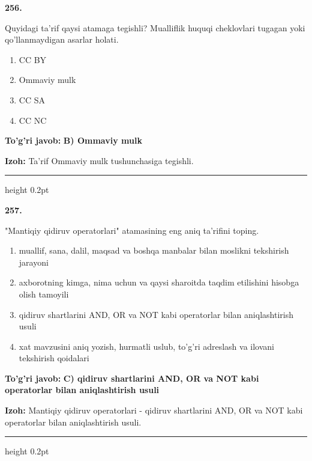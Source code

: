 \documentclass[10pt,a4paper,oneside]{article}
\begin{document}
\noindent\textbf{\color{ink}256.}
\par
Quyidagi ta'rif qaysi atamaga tegishli? Mualliflik huquqi cheklovlari tugagan yoki qo'llanmaydigan asarlar holati.
\begin{enumerate}[label=\Alph*),leftmargin=9mm]
\item CC BY
\item Ommaviy mulk
\item CC SA
\item CC NC
\end{enumerate}
\begin{tcolorbox}[enhanced,breakable,colback=teal!4,colframe=teal!50!black,boxrule=0.5pt,arc=1.1mm,left=3mm,right=3mm,top=1.7mm,bottom=1.7mm,before skip=2mm,after skip=2mm]
\textbf{\color{teal}To'g'ri javob:} \textbf{B) Ommaviy mulk}
\par\smallskip
\textbf{Izoh:} Ta'rif Ommaviy mulk tushunchasiga tegishli.
\end{tcolorbox}
\vspace{2mm}\hrule height 0.2pt \vspace{3mm}

\noindent\textbf{\color{ink}257.}
\par
"Mantiqiy qidiruv operatorlari" atamasining eng aniq ta'rifini toping.
\begin{enumerate}[label=\Alph*),leftmargin=9mm]
\item muallif, sana, dalil, maqsad va boshqa manbalar bilan moslikni tekshirish jarayoni
\item axborotning kimga, nima uchun va qaysi sharoitda taqdim etilishini hisobga olish tamoyili
\item qidiruv shartlarini AND, OR va NOT kabi operatorlar bilan aniqlashtirish usuli
\item xat mavzusini aniq yozish, hurmatli uslub, to'g'ri adreslash va ilovani tekshirish qoidalari
\end{enumerate}
\begin{tcolorbox}[enhanced,breakable,colback=teal!4,colframe=teal!50!black,boxrule=0.5pt,arc=1.1mm,left=3mm,right=3mm,top=1.7mm,bottom=1.7mm,before skip=2mm,after skip=2mm]
\textbf{\color{teal}To'g'ri javob:} \textbf{C) qidiruv shartlarini AND, OR va NOT kabi operatorlar bilan aniqlashtirish usuli}
\par\smallskip
\textbf{Izoh:} Mantiqiy qidiruv operatorlari - qidiruv shartlarini AND, OR va NOT kabi operatorlar bilan aniqlashtirish usuli.
\end{tcolorbox}
\vspace{2mm}\hrule height 0.2pt \vspace{3mm}
\end{document}
